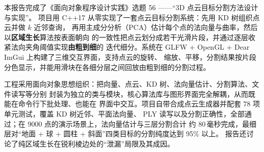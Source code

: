 本报告完成了《面向对象程序设计实践》选题 56 ——“3D 点云目标分割方法设计与实现”。
项目用 C++17 从零实现了一套点云目标分割系统：先用 KD 树组织点云并做 $k$ 近邻查询，
再用主成分分析（PCA）估计每个点的法向量与曲率，然后以\textbf{区域生长}算法按表面朝向
的一致性把点云划分成若干光滑片段，并通过逐层收紧法向夹角阈值实现\textbf{由粗到细}的
迭代细分。系统在 GLFW + OpenGL + Dear ImGui 上构建了三维交互界面，支持点云的旋转、
缩放、平移，分割结果按片段分色显示，并能用滑块在各细分层之间回放由粗到细的分割过程。

工程采用面向对象思想组织：把向量、点云、KD 树、法向量估计、分割算法、文件读写等分别
封装为独立的类与模块，核心算法库与图形界面完全解耦，从而既能在命令行下批处理、也能在
界面中交互。项目自带合成点云生成器并配套 78 项单元测试，覆盖 KD 树近邻、平面法向量、
PLY 读写以及分割正确性，全部通过；在 9000 点的演示场景上，法向量估计与三层分割合计
约 80\,毫秒完成，最细层对“地面 + 球 + 圆柱 + 斜面”四类目标的分割纯度达到 95\% 以上。
报告还讨论了纯区域生长在锐利棱边处的“泄漏”局限及其成因。
